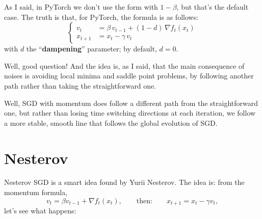 \begin{notebox}
As I said, in PyTorch we don't use the form with $1-\beta$, but that's the default case. The truth is that, for PyTorch, the formula is as follows:
\[
\left\{\begin{aligned}
v_t&=\beta\,v_{t-1}+(1-d)\,\nabla f_t(x_t)\\
x_{t+1}&=x_t-\gamma\,v_t
\end{aligned}\right.
\]
with $d$ the ``\textbf{dampening}'' parameter; by default, $d=0$.
\end{notebox}


Well, good question! And the idea is, as I said, that the main consequence of noises is avoiding local minima and saddle point problems, by following another path rather than taking the straightforward one.

Well, SGD with momentum does follow a different path from the straightforward one, but rather than losing time switching directions at each iteration, we follow a more stable, smooth line that follows the global evolution of SGD.

\section{Nesterov}


Nesterov SGD is a smart idea found by Yurii Nesterov. The idea is: from the momentum formula,
\[
v_t=\beta v_{t-1}+\nabla f_t(x_t),\qquad\text{then:}\qquad x_{t+1}=x_t-\gamma v_t,
\]
let's see what happens:

\begin{center}
\end{center}

